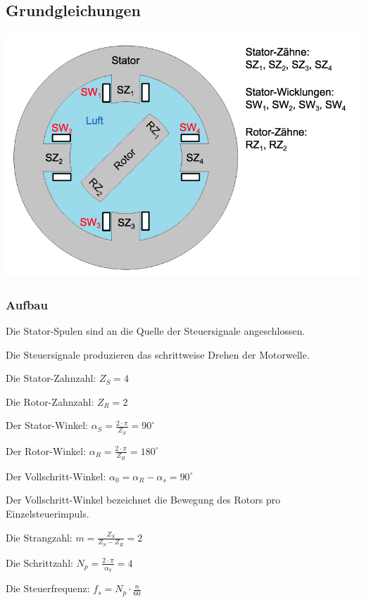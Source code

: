\subsection{Grundgleichungen}
\begin{minipage}{0.5 \linewidth}
\includegraphics[width = \linewidth]{./Pics/VL67/AufbauRe}
\end{minipage}
\begin{minipage}{0.5 \linewidth}
\subsubsection{Aufbau}
\begin{compactitem}
\item Die Stator-Spulen sind an die Quelle der Steuersignale angeschlossen.
\item Die Steuersignale produzieren das schrittweise Drehen der Motorwelle.
\item Die Stator-Zahnzahl: $Z_S = 4$
\item Die Rotor-Zahnzahl: $Z_R = 2$
\item Der Stator-Winkel: $\alpha_S = \frac{2\cdot \pi}{Z_S} = 90^\circ$
\item Der Rotor-Winkel: $\alpha_R =  \frac{2\cdot \pi}{Z_R} = 180^\circ$
\item Der Vollschritt-Winkel: $\alpha_0 = \alpha_R - \alpha_s = 90^\circ$ 
\item Der Vollschritt-Winkel bezeichnet die Bewegung des Rotors pro Einzelsteuerimpuls.
\item Die Strangzahl: $m = \frac{Z_S}{Z_S - Z_R} = 2$
\item Die Schrittzahl: $N_p = \frac{2\cdot \pi}{\alpha_0} = 4$
\item Die Steuerfrequenz: $f_s = N_p \cdot \frac{n}{60}$ 
\end{compactitem}
\end{minipage}

